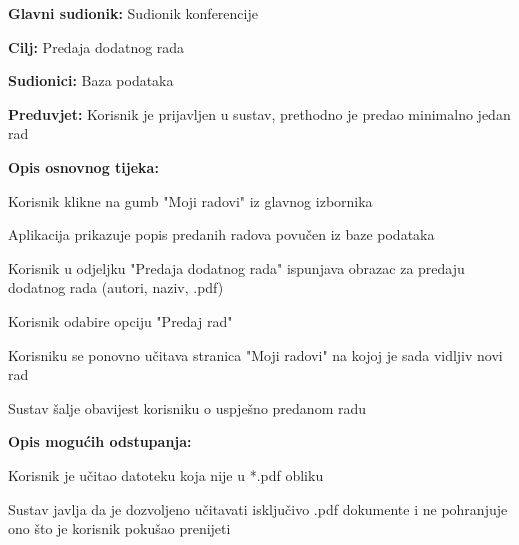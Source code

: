 					\begin{packed_item}
						
						\item \textbf{Glavni sudionik: } Sudionik konferencije
						\item  \textbf{Cilj:} Predaja dodatnog rada
						\item  \textbf{Sudionici:} Baza podataka
						\item  \textbf{Preduvjet:} Korisnik je prijavljen u sustav, prethodno je predao minimalno jedan rad
						\item  \textbf{Opis osnovnog tijeka:}
						                                                                          
						\item[] \begin{packed_enum}
							\item Korisnik klikne na gumb "Moji radovi" iz glavnog izbornika
							\item Aplikacija prikazuje popis predanih radova povučen iz baze podataka
							\item Korisnik u odjeljku "Predaja dodatnog rada" ispunjava obrazac za predaju dodatnog rada (autori, naziv, .pdf)
							\item Korisnik odabire opciju "Predaj rad"
							\item Korisniku se ponovno učitava stranica "Moji radovi" na kojoj je sada vidljiv novi rad
							\item Sustav šalje obavijest korisniku o uspješno predanom radu 
							
							
						\end{packed_enum}
						
						\item  \textbf{Opis mogućih odstupanja:}
						        
						\item[] \begin{packed_item}
							
							\item[4.a]  Korisnik je učitao datoteku koja nije u *.pdf obliku
							\item[] \begin{packed_enum}
								
								\item Sustav javlja da je dozvoljeno učitavati isključivo .pdf dokumente i ne pohranjuje ono što je korisnik pokušao prenijeti
								      
							\end{packed_enum}
							

\end{packed_item}
\end{packed_item}
